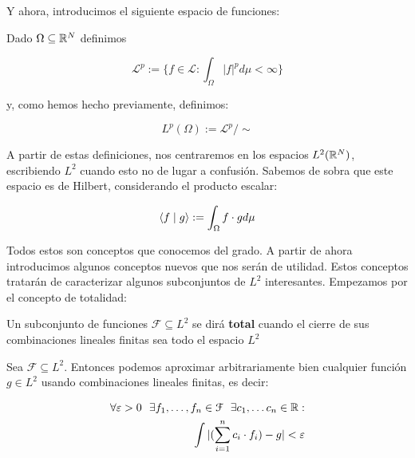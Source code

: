 Y ahora, introducimos el siguiente espacio de funciones:

\begin{definicion}
    Dado $\Omega \subseteq \mathbb{R}^N$ definimos

    \begin{equation}
        \mathcal{L}^p := \{ f \in \mathcal{L} : \int_{\Omega} |f|^p d\mu < \infty \}
    \end{equation}

    y, como hemos hecho previamente, definimos:

    \begin{equation}
        L^p(\Omega) := \mathcal{L}^p / \sim
    \end{equation}

\end{definicion}

A partir de estas definiciones, nos centraremos en los espacios $L^2(\mathbb{R}^N)$, escribiendo $L^2$ cuando esto no de lugar a confusión. Sabemos de sobra que este espacio es de Hilbert, considerando el producto escalar:

\begin{equation}
    \langle f \; | \; g \rangle := \int_{\Omega} f \cdot g d\mu
\end{equation}

Todos estos son conceptos que conocemos del grado. A partir de ahora introducimos algunos conceptos nuevos que nos serán de utilidad. Estos conceptos tratarán de caracterizar algunos subconjuntos de $L^2$ interesantes. Empezamos por el concepto de totalidad:

\begin{definicion}
    Un subconjunto de funciones $\mathcal{F} \subseteq L^2$ se dirá \textbf{total} cuando el cierre de sus combinaciones lineales finitas sea todo el espacio $L^2$
\end{definicion}

\begin{proposicion}
    Sea $\mathcal{F} \subseteq L^2$. Entonces podemos aproximar arbitrariamente bien cualquier función $g \in L^2$ usando combinaciones lineales finitas, es decir:

    \begin{equation}
    \begin{split}
        \forall \varepsilon > 0 \ \  \exists f_1, \ldots, f_n \in \mathcal{F} \ \  \exists c_1, \ldots c_n \in \mathbb{R}:\\
        \int | (\sum_{i = 1}^n c_i \cdot f_i) - g| < \varepsilon \\
    \end{split}
    \end{equation}

\end{proposicion}


